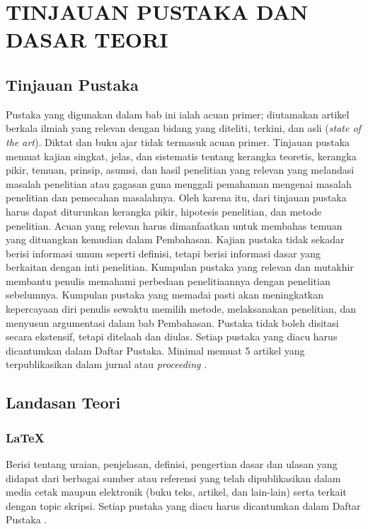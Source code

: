 
\chapter{TINJAUAN PUSTAKA DAN DASAR TEORI}                

\section{Tinjauan Pustaka}
  Pustaka yang digunakan dalam bab ini ialah acuan primer; diutamakan artikel berkala ilmiah yang relevan dengan bidang yang diteliti, terkini, dan asli (\textit{state of the art}). Diktat dan buku ajar tidak termasuk acuan primer. Tinjauan pustaka memuat kajian singkat, jelas, dan sistematis tentang kerangka teoretis, kerangka pikir, temuan, prinsip, asumsi, dan hasil penelitian yang relevan yang melandasi masalah penelitian atau gagasan guna menggali pemahaman mengenai masalah penelitian dan pemecahan masalahnya. Oleh karena itu, dari tinjauan pustaka harus dapat diturunkan kerangka pikir, hipotesis penelitian, dan metode penelitian. Acuan yang relevan harus dimanfaatkan untuk membahas temuan yang dituangkan kemudian dalam Pembahasan. Kajian pustaka tidak sekadar berisi informasi umum seperti definisi, tetapi berisi informasi dasar yang berkaitan dengan inti penelitian. Kumpulan pustaka yang relevan dan mutakhir membantu penulis memahami perbedaan penelitiaannya dengan penelitian sebelumnya. Kumpulan pustaka yang memadai pasti akan meningkatkan kepercayaan diri penulis sewaktu memilih metode, melaksanakan penelitian, dan menyusun argumentasi dalam bab Pembahasan. Pustaka tidak boleh disitasi secara ekstensif, tetapi ditelaah dan diulas. Setiap pustaka yang diacu harus dicantumkan dalam Daftar Pustaka. Minimal memuat 5 artikel yang terpublikasikan dalam jurnal atau \textit{proceeding} \parencite{affum2021}.

\section{Landasan Teori}
  \subsection{\LaTeX}
Berisi tentang uraian, penjelasan, definisi, pengertian dasar dan ulasan yang didapat dari berbagai sumber atau referensi yang telah dipublikasikan dalam media cetak maupun elektronik (buku teks, artikel, dan lain-lain) serta terkait dengan topic skripsi. Setiap pustaka yang diacu harus dicantumkan dalam Daftar Pustaka \parencite{alden2020}.

